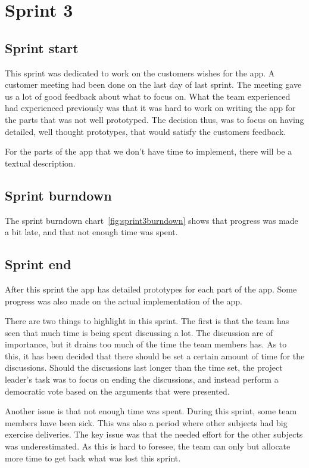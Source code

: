 \section{Sprint 3}
\subsection{Sprint start}
This sprint was dedicated to work on the customers wishes for the app. A customer meeting had been done on the last day of last sprint. The meeting gave us a lot of good feedback about what to focus on.
What the team experienced had experienced previously was that it was hard to work on writing the app for the parts that was not well prototyped.
The decision thus, was to focus on having detailed, well thought prototypes, that would satisfy the customers feedback. 

For the parts of the app that we don't have time to implement, there will be a textual description.

\subsection{Sprint burndown}

The sprint burndown chart~\ref{fig:sprint3burndown} shows that progress was made a bit late, and that not enough time was spent.





\subsection{Sprint end}
After this sprint the app has detailed prototypes for each part of the app.  Some progress was also made on the actual implementation of the app.

There are two things to highlight in this sprint. The first is that the team has seen that much time is being spent discussing a lot. The discussion are of importance, but it drains too much of the time the team members has. As to this, it has been decided that there should be set a certain amount of time for the discussions. Should the discussions last longer than the time set, the project leader's task was to focus on ending the discussions, and instead perform a democratic vote based on the arguments that were presented. 

Another issue is that not enough time was spent. During this sprint, some team  members have been sick. This was also a period where other subjects had big exercise deliveries. The key issue was that the needed effort for the other subjects was underestimated. As this is hard to foresee, the team can only but allocate more time to get back what was lost this sprint.